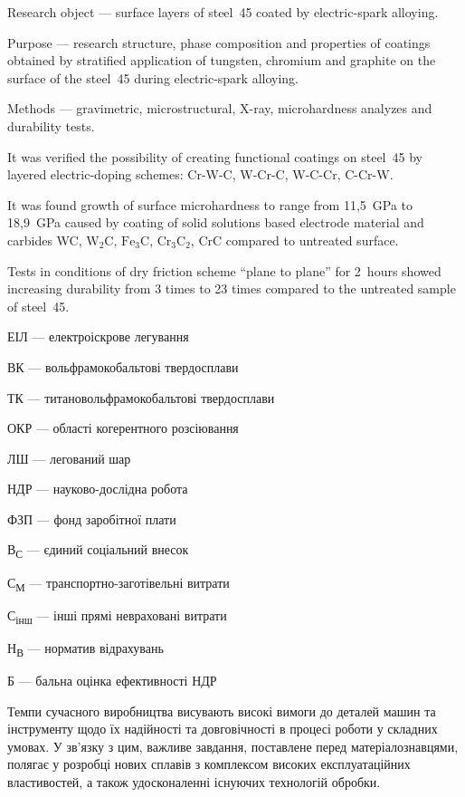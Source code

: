 \documentclass[a4paper,fontsize=14bp,ukrainian]{extreport}
\begin{document}
Research object --- surface layers of steel~45 coated by electric-spark alloying.

Purpose --- research structure, phase composition and properties of coatings obtained by stratified application of tungsten, chromium and graphite on the surface of the steel~45 during electric-spark alloying.

Methods --- gravimetric, microstructural, X-ray, microhardness analyzes and durability tests.

It was verified the possibility of creating functional coatings on steel~45 by layered electric-doping schemes: Cr-W-C, W-Cr-C, W-C-Cr, C-Cr-W.

It was found growth of surface microhardness to range from 11,5~GPa to 18,9~GPa caused by coating of solid solutions based electrode material and carbides WC, $\text{W}_2\text{C}$, $\text{Fe}_{3}\text{C}$, $\text{Cr}_{3}\text{C}_{2}$, $\text{CrC}$ compared to untreated surface.

Tests in conditions of dry friction scheme ``plane to plane'' for 2~hours showed increasing durability from 3 times to 23 times compared to the untreated sample of steel~45.

\newpage
\tableofcontents
\thispagestyle{empty}

\label{likechap:abbrevation}

ЕІЛ --- електроіскрове легування

ВК --- вольфрамокобальтові твердосплави

ТК --- титановольфрамокобальтові твердосплави

ОКР --- області когерентного розсіювання

ЛШ --- легований шар

НДР --- науково-дослідна робота

ФЗП  --- фонд заробітної плати

В\textsubscript{С} --- єдиний соціальний внесок

С\textsubscript{М} --- транспортно-заготівельні витрати

С\textsubscript{інш} --- інші прямі невраховані витрати

Н\textsubscript{В} --- норматив відрахувань

Б --- бальна оцінка ефективності НДР


\label{likechap:intro}

Темпи сучасного виробництва висувають високі вимоги до деталей машин та інструменту щодо їх надійності та довговічності в процесі роботи у складних умовах. У зв’язку з цим, важливе завдання, поставлене перед матеріалознавцями, полягає у розробці нових сплавів з комплексом високих експлуатаційних властивостей, а також удосконаленні існуючих технологій обробки.
\end{document}
